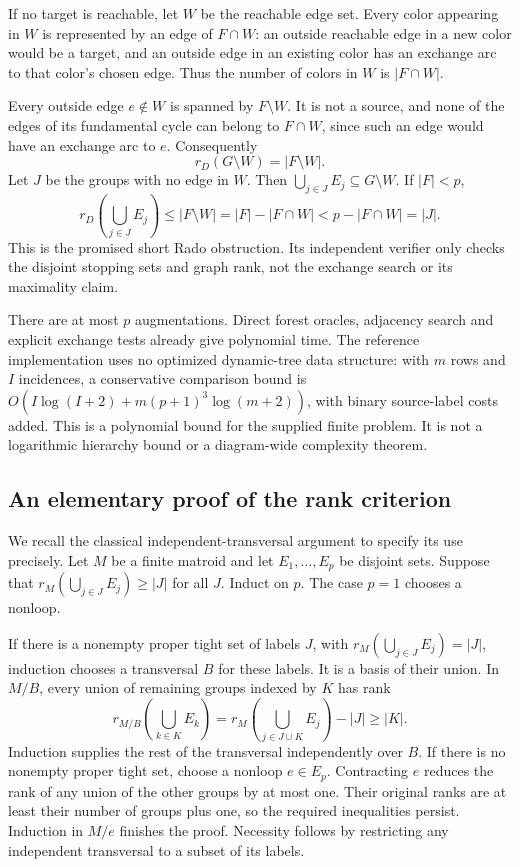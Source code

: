 If no target is reachable, let $W$ be the reachable edge set.  Every
color appearing in $W$ is represented by an edge of $F\cap W$: an
outside reachable edge in a new color would be a target, and an outside
edge in an existing color has an exchange arc to that color's chosen
edge.  Thus the number of colors in $W$ is $|F\cap W|$.

Every outside edge $e\notin W$ is spanned by $F\setminus W$.  It is not
a source, and none of the edges of its fundamental cycle can belong to
$F\cap W$, since such an edge would have an exchange arc to $e$.
Consequently
\[
                         r_D(G\setminus W)=|F\setminus W|.
\]
Let $J$ be the groups with no edge in $W$.  Then
$\bigcup_{j\in J}E_j\subseteq G\setminus W$.  If $|F|<p$,
\[
 r_D\left(\bigcup_{j\in J}E_j\right)
 \le |F\setminus W|
 =|F|-|F\cap W|
 <p-|F\cap W|=|J|.
\]
This is the promised short Rado obstruction.  Its independent verifier
only checks the disjoint stopping sets and graph rank, not the exchange
search or its maximality claim.

There are at most $p$ augmentations.  Direct forest oracles, adjacency
search and explicit exchange tests already give polynomial time.  The
reference implementation uses no optimized dynamic-tree data structure:
with $m$ rows and $I$ incidences, a conservative comparison bound is
$O(I\log(I+2)+m(p+1)^3\log(m+2))$, with binary source-label costs added.
This is a polynomial bound for the supplied finite problem.  It is not
a logarithmic hierarchy bound or a diagram-wide complexity theorem.

\subsection{An elementary proof of the rank criterion}

We recall the classical independent-transversal argument to specify its
use precisely.  Let $M$ be a finite matroid and let $E_1,\ldots,E_p$ be
disjoint sets.  Suppose that $r_M(\bigcup_{j\in J}E_j)\ge |J|$ for all
$J$.  Induct on $p$.  The case $p=1$ chooses a nonloop.

If there is a nonempty proper tight set of labels $J$, with
$r_M(\bigcup_{j\in J}E_j)=|J|$, induction chooses a transversal $B$
for these labels.  It is a basis of their union.  In $M/B$, every union
of remaining groups indexed by $K$ has rank
\[
 r_{M/B}\left(\bigcup_{k\in K}E_k\right)
 =r_M\left(\bigcup_{j\in J\cup K}E_j\right)-|J|
 \ge |K|.
\]
Induction supplies the rest of the transversal independently over $B$.
If there is no nonempty proper tight set, choose a nonloop $e\in E_p$.
Contracting $e$ reduces the rank of any union of the other groups by at
most one.  Their original ranks are at least their number of groups
plus one, so the required inequalities persist.  Induction in $M/e$
finishes the proof.  Necessity follows by restricting any independent
transversal to a subset of its labels.


